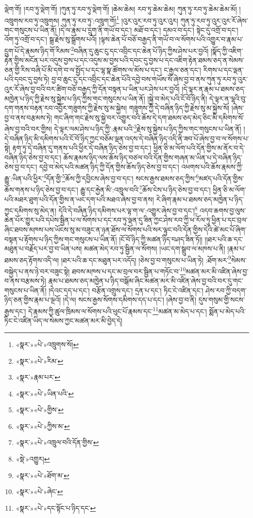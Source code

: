 ལྡེག་གོ། །རབ་ཏུ་ལྡེག་གོ། །ཀུན་ཏུ་རབ་ཏུ་ལྡེག་གོ། །ཆེམ་ཆེམ། རབ་ཏུ་ཆེམ་ཆེམ། ཀུན་ཏུ་རབ་ཏུ་ཆེམ་ཆེམ་མོ། །འཁྲུགས་རབ་ཏུ་འཁྲུགས། ཀུན་ཏུ་རབ་ཏུ་:འཁྲུག་གོ།\footnote{«སྣར་»«པེ་»འཁྲུགས་སོ།} །འུར་འུར་རབ་ཏུ་འུར་འུར། ཀུན་ཏུ་རབ་ཏུ་འུར་འུར་རོ་ཞེས་གང་གསུངས་པ་ཡིན་ནོ། །དེ་ལ་རྣམ་པ་དྲུག་ནི་གཡོ་བ་དང་། མཐོ་བ་དང་། དམའ་བ་དང་། སྟེང་དུ་འགྲོ་བ་དང་། འོག་ཏུ་འགྲོ་བ་དང་། སྒྲ་རྗེས་སུ་སྒྲོགས་པའོ། །ལྟས་ཆེན་པོ་བཅོ་བརྒྱད་ནི་གཡོ་བ་ལ་སོགས་པའི་འགྱུར་བ་རྣམ་པ་དྲུག་པོ་དེ་རྣམས་ཉིད་གོ་རིམས་\footnote{«སྣར་»«པེ་»རིམ་}བཞིན་དུ་ཆུང་ངུ་དང་འབྲིང་དང་ཆེན་པོ་ཉིད་ཀྱིས་ཤེས་པར་བྱའོ། །སྣོད་ཀྱི་འཇིག་རྟེན་གྱིས་མངོན་པར་འདུས་བྱས་པ་དང་འདུས་མ་བྱས་པའི་དབང་དུ་བྱས་པ་དང་འཇིག་རྟེན་ཐམས་ཅད་ན་སེམས་ཅན་གྱི་རིས་བཞི་པོ་མི་དགེ་བ་ལ་སྤྱོད་པ་དང་ལྷ་སྣ་ཚོགས་ལ་མོས་པ་དང་། ང་རྒྱལ་ཅན་དང་། རིགས་པ་དང་ལྡན་པའི་དབང་དུ་བྱས་ཏེ། བྱ་བ་ཆུང་ངུ་དང་འབྲིང་དང་ཆེན་པོའི་དབྱེ་བས་གཡོས་སོ་ཞེས་བྱ་བ་ནས་ཀུན་ཏུ་རབ་ཏུ་འུར་འུར་རོ་ཞེས་བྱ་བའི་བར་ཚིག་བཅོ་བརྒྱད་ཀྱི་དོན་བསྟན་པ་ཡིན་པར་ཤེས་པར་བྱའོ། །དེ་ལྟར་ན་རྣམ་པ་ཐམས་ཅད་མཁྱེན་པ་ཉིད་ཀྱི་རྗེས་སུ་སྐྱེས་པ་ཉིད་ཀྱིས་གང་གསུངས་པ་ཡིན་ནོ། །སྐྱེ་བ་མེད་པའི་ངོ་བོ་ཉིད་ནི། དེ་ལྟར་ན་ལྷའི་བུ་དག་གནས་བརྟན་རབ་འབྱོར་གཟུགས་ཀྱི་རྗེས་སུ་མ་སྐྱེས། གཟུགས་ཀྱི་དེ་བཞིན་ཉིད་ཀྱི་རྗེས་སུ་མ་སྐྱེས་སོ། །ཞེས་བྱ་བ་ནས་བརྩམས་ཏེ། གང་ཞིག་གང་རྗེས་སུ་སྐྱེ་བར་འགྱུར་བའི་ཆོས་དེ་དག་ཐམས་ཅད་མེད་ཅིང་མི་དམིགས་སོ་ཞེས་བྱ་བའི་བར་གྱིས། དེ་ལྟར་ལམ་ཤེས་པ་ཉིད་ཀྱི་:རྣམ་པའི་\footnote{«སྣར་»རྣམ་པར་}རྗེས་སུ་སྐྱེས་པ་ཉིད་ཀྱིས་གང་གསུངས་པ་ཡིན་ནོ། །དེ་བཞིན་ཉིད་མི་དམིགས་པའི་ངོ་བོ་ཉིད་ཀྱང་བཅོམ་ལྡན་འདས་དེ་བཞིན་ཉིད་འདི་ནི་ཟབ་པོ་ཞེས་བྱ་བ་ལ་སོགས་པ་སྟེ། རྟག་ཏུ་དེ་བཞིན་དུ་གནས་པའི་ཕྱིར་དེ་བཞིན་ཉིད་ཅེས་བྱ་བ་དང་། ཕྱིན་ཅི་མ་ལོག་པའི་དོན་གྱིས་མ་ནོར་བ་དེ་བཞིན་ཉིད་ཅེས་བྱ་བ་དང་། ཆོས་རྣམས་ཉིད་ལས་ཆོས་ཉིད་བཙལ་བའི་དོན་གྱིས་གཞན་མ་ཡིན་པ་དེ་བཞིན་ཉིད་ཅེས་བྱ་བ་དང་། དབྱེ་བ་མེད་པའི་མཚན་ཉིད་ཀྱི་དོན་གྱིས་ཆོས་ཉིད་ཅེས་བྱ་བ་དང་། འཕགས་པའི་ཆོས་རྣམས་ཀྱི་རྒྱུ་:ཡིན་པའི་ཕྱིར་\footnote{«སྣར་»«པེ་»ཡིན་པའི་}དོན་གྱི་\footnote{«སྣར་»«པེ་»གྱིས་}ཆོས་ཀྱི་དབྱིངས་ཞེས་བྱ་བ་དང་། སངས་རྒྱས་ཐམས་ཅད་ཀྱིས་\footnote{«སྣར་»«པེ་»ཀྱིས་མ་}མཛད་པའི་དོན་གྱིས་ཆོས་གནས་པ་ཉིད་ཅེས་བྱ་བ་དང་། རྒྱུ་དང་རྐྱེན་མི་:འཁྲུལ་བའི་\footnote{«སྣར་»«པེ་»འཁྲུལ་བའི་དོན་གྱིས་}ཆོས་ངེས་པ་ཉིད་ཅེས་བྱ་བ་དང་། ཕྱིན་ཅི་མ་ལོག་པའི་མཐར་ཐུག་པའི་དོན་གྱིས་ན་ཡང་དག་པའི་མཐའ་ཞེས་བྱ་བ་ནས། རེ་ཞིག་རྣམ་པ་ཐམས་ཅད་མཁྱེན་པ་ཉིད་ཀྱང་དམིགས་སུ་མེད་ན། དེའི་དེ་བཞིན་ཉིད་དམིགས་པར་ལྟ་ག་ལ་:འགྱུར་ཞེས་བྱ་བ་དང་།\footnote{«སྡེ་»འགྱུར།} འདབ་ཆགས་བྱ་ལུས་ཆེན་པོར་གྱུར་པའི་དཔེས་སྦྱིན་པ་ལ་སོགས་པ་དང་རབ་ཏུ་ལྡན་དུ་ཟིན་ཀྱང་ཤེས་རབ་ཀྱི་ཕ་རོལ་ཏུ་ཕྱིན་པ་དང་བྲལ་ཞིང་ཐབས་མཁས་པས་ཡོངས་སུ་མ་བཟུང་ན་ཉན་ཐོས་ལ་སོགས་པའི་སར་ལྟུང་བའི་དོན་གྱིས་དེའི་ཚེ་མང་པོ་ཞིག་བསྟན་པ་རྟོགས་པ་ཉིད་ཀྱིས་གང་གསུངས་པ་ཡིན་ནོ། །ངོ་བོ་ཉིད་ཀྱི་མཚན་ཉིད་བཤད་ཟིན་ཏོ།། །།ཐར་པའི་ཆ་དང་མཐུན་པ་བརྗོད་པར་བྱ་བ་ཡིན་པས། མཚན་མེད་རབ་ཏུ་སྦྱིན་ལ་སོགས། །ཡང་དག་སྒྲུབ་ལ་མཁས་པ་ནི། །རྣམ་པ་ཐམས་ཅད་རྟོགས་འདི་ལ། །ཐར་པའི་ཆ་དང་མཐུན་པར་འདོད། །ཅེས་བྱ་བ་གསུངས་པ་ཡིན་ཏེ། :ཐོག་མར་\footnote{«སྣར་»«པེ་»ཐོག་མ་}སེམས་བསྐྱེད་པ་ནས་ཉེ་བར་བཟུང་སྟེ། ཐབས་མཁས་པ་དང་མ་བྲལ་བར་སྦྱིན་པ་གཏོང་བ་\footnote{«སྣར་»«པེ་»ཞེང་}མཚན་མར་མི་འཛིན་ཞེས་བྱ་བ་ནས་བརྩམས་ཏེ། རྣམ་པ་ཐམས་ཅད་མཁྱེན་པ་ཉིད་བསྒོམ་ཞིང་མཚན་མར་མི་འཛིན་ཞེས་བྱ་བའི་བར་དུ་གང་གསུངས་པ་ཡིན་ནོ། །དེའང་དད་པ་དང་། བརྩོན་འགྲུས་དང་། དྲན་པ་དང་། ཏིང་ངེ་འཛིན་དང་། ཤེས་རབ་ཀྱི་བདག་ཉིད་ཅན་གྱིས་རྣམ་པ་ལྔའོ། །དེ་ལ། སངས་རྒྱས་སོགས་དམིགས་དད་པ་དང་། །ཞེས་བྱ་བ་ནི། དུས་གསུམ་གྱི་སངས་རྒྱས་དང་། དེ་རྣམས་ཀྱི་ཚུལ་ཁྲིམས་ལ་སོགས་པའི་ཕུང་པོ་རྣམས་དང་\footnote{«སྣར་»«པེ་»དང་སྟོང་པ་ཉིད་དང་}མཚན་མ་མེད་པ་དང་། སྨོན་པ་མེད་པའི་ཏིང་ངེ་འཛིན་ཡིད་ལ་སེམས་ཀྱང་མཚན་མར་མི་བྱེད་དེ། 